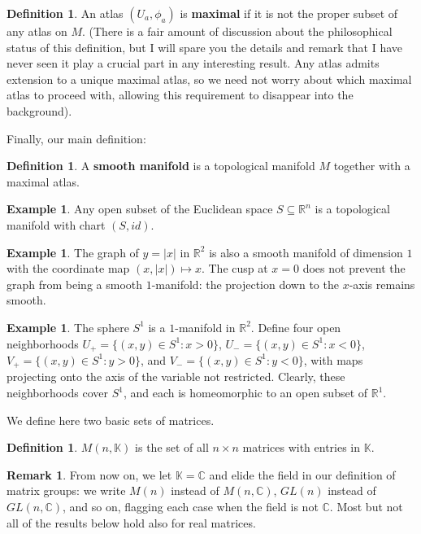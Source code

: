 \documentclass[12pt]{article}
\newcommand{\C}{\mathbb{C}}
\newcommand{\R}{\mathbb{R}}
\newcommand{\K}{\mathbb{K}}
\theoremstyle{definition}
\theoremstyle{definition}
\theoremstyle{definition}
\theoremstyle{definition}
\newtheorem{rmk}[them]{Remark}
\theoremstyle{definition}
\newtheorem{defn}[them]{Definition}
\theoremstyle{definition}
\newtheorem{ex}[them]{Example}
\theoremstyle{definition}
\theoremstyle{definition}
\begin{document}
\begin{defn}
An atlas $(U_a, \phi_a)$ is \textbf{maximal} if it
is not the proper subset of any atlas on $M$.
(There is a fair amount of discussion about the
philosophical status of this definition, but I
will spare you the details and remark that I have
never seen it play a crucial part in any
interesting result. Any atlas admits extension to
a unique maximal atlas, so we need not worry about
which maximal atlas to proceed with, allowing this
requirement to disappear into the background).
\end{defn}

\par{Finally, our main definition:}
\begin{defn} A \textbf{smooth
manifold} is a topological manifold $M$ together
with a maximal atlas.
\end{defn}

\begin{ex}
    \par{Any open subset of the Euclidean space $S
    \subseteq \R^n$ is a topological manifold with
    chart $(S, id)$.}
\end{ex}

\begin{ex}
The graph of $y = |x|$ in $\R^2$ is also a
smooth manifold of dimension $1$ with the
coordinate map $(x, |x|) \mapsto x$. The cusp at
$x = 0$ does not prevent the graph from being a
smooth $1$-manifold: the projection down to the
$x$-axis remains smooth.
\end{ex}

\begin{ex} The sphere $S^1$ is a $1$-manifold in $\R^2$.
Define four open neighborhoods $U_+ = \{(x,y) \in
S^1 : x > 0\}$, $U_{-} = \{(x,y) \in S^1 : x <
0\}$, $V_+ = \{(x,y) \in S^1 : y > 0\}$, and
$V_{-} = \{(x,y) \in S^1 : y < 0\}$, with maps
projecting onto the axis of the variable not
restricted. Clearly, these neighborhoods cover
$S^1$, and each is homeomorphic to an open subset
of $\R^1$.
\end{ex}   

\par{We define here two basic sets of matrices.}

\begin{defn}
    $M(n,\K)$ is the set of all $n \times
    n$ matrices with entries in $\K$.
\end{defn}

\begin{rmk}
    From now on, we let $\K = \C$ and elide the
    field in our definition of matrix groups: we
    write $M(n)$ instead of $M(n, \C)$, $GL(n)$
    instead of $GL(n, \C)$, and so on, flagging
    each case when the field is not $\C$. Most
    but not all of the results below hold also
    for real matrices.
\end{rmk}
\end{document}
